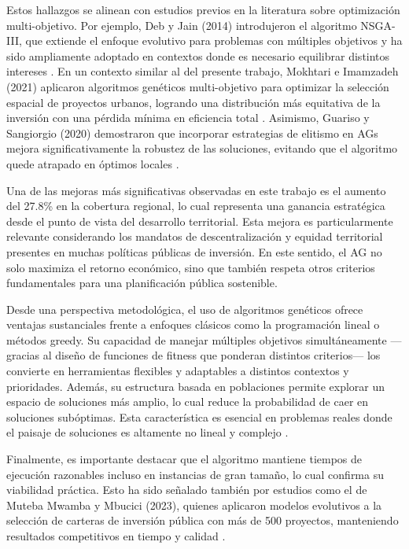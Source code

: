 \documentclass[12pt,a4paper]{article}
\begin{document}
Estos hallazgos se alinean con estudios previos en la literatura sobre optimización multi-objetivo. Por ejemplo, Deb y Jain (2014) introdujeron el algoritmo NSGA-III, que extiende el enfoque evolutivo para problemas con múltiples objetivos y ha sido ampliamente adoptado en contextos donde es necesario equilibrar distintos intereses \cite{deb2014evolutionary}. En un contexto similar al del presente trabajo, Mokhtari e Imamzadeh (2021) aplicaron algoritmos genéticos multi-objetivo para optimizar la selección espacial de proyectos urbanos, logrando una distribución más equitativa de la inversión con una pérdida mínima en eficiencia total \cite{mokhtari2021balancing}. Asimismo, Guariso y Sangiorgio (2020) demostraron que incorporar estrategias de elitismo en AGs mejora significativamente la robustez de las soluciones, evitando que el algoritmo quede atrapado en óptimos locales \cite{guariso2020improving}.

Una de las mejoras más significativas observadas en este trabajo es el aumento del 27.8\% en la cobertura regional, lo cual representa una ganancia estratégica desde el punto de vista del desarrollo territorial. Esta mejora es particularmente relevante considerando los mandatos de descentralización y equidad territorial presentes en muchas políticas públicas de inversión. En este sentido, el AG no solo maximiza el retorno económico, sino que también respeta otros criterios fundamentales para una planificación pública sostenible.

Desde una perspectiva metodológica, el uso de algoritmos genéticos ofrece ventajas sustanciales frente a enfoques clásicos como la programación lineal o métodos greedy. Su capacidad de manejar múltiples objetivos simultáneamente —gracias al diseño de funciones de fitness que ponderan distintos criterios— los convierte en herramientas flexibles y adaptables a distintos contextos y prioridades. Además, su estructura basada en poblaciones permite explorar un espacio de soluciones más amplio, lo cual reduce la probabilidad de caer en soluciones subóptimas. Esta característica es esencial en problemas reales donde el paisaje de soluciones es altamente no lineal y complejo \cite{deb2002fast}.

Finalmente, es importante destacar que el algoritmo mantiene tiempos de ejecución razonables incluso en instancias de gran tamaño, lo cual confirma su viabilidad práctica. Esto ha sido señalado también por estudios como el de Muteba Mwamba y Mbucici (2023), quienes aplicaron modelos evolutivos a la selección de carteras de inversión pública con más de 500 proyectos, manteniendo resultados competitivos en tiempo y calidad \cite{muteba2023}.
\end{document}
